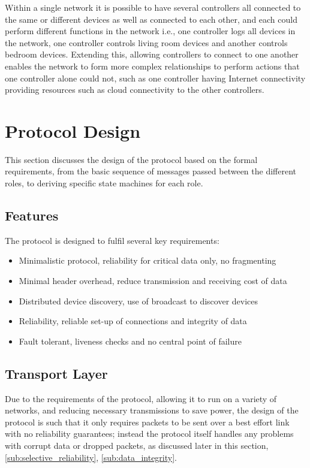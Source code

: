 Within a single network it is possible to have several controllers all connected to the same or different devices as well as connected to each other, and each could perform different functions in the network i.e., one controller logs all devices in the network, one controller controls living room devices and another controls bedroom devices. Extending this, allowing controllers to connect to one another enables the network to form more complex relationships to perform actions that one controller alone could not, such as one controller having Internet connectivity providing resources such as cloud connectivity to the other controllers.


\section{Protocol Design} %
\label{sec:protocol_design}
This section discusses the design of the protocol based on the formal requirements, from the basic sequence of messages passed between the different roles, to deriving specific state machines for each role.

\subsection{Features} %
\label{sub:features}
The protocol is designed to fulfil several key requirements:
\begin{itemize}
	\item Minimalistic protocol, reliability for critical data only, no fragmenting
	\item Minimal header overhead, reduce transmission and receiving cost of data
	\item Distributed device discovery, use of broadcast to discover devices
	\item Reliability, reliable set-up of connections and integrity of data
	\item Fault tolerant, liveness checks and no central point of failure
\end{itemize}


\subsection{Transport Layer}
Due to the requirements of the protocol, allowing it to run on a variety of networks, and reducing necessary transmissions to save power, the design of the protocol is such that it only requires packets to be sent over a best effort link with no reliability guarantees; instead the protocol itself handles any problems with corrupt data or dropped packets, as discussed later in this section,\ref{sub:selective_reliability}, \ref{sub:data_integrity}. 

